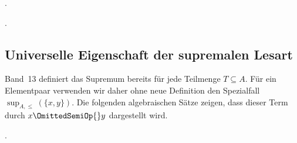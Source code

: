\documentclass[main.tex]{subfiles}
\begin{document}
\par\noindent\begin{minipage}{\linewidth}
\par\noindent{}.\par
\end{minipage}\par


\par\noindent\begin{minipage}{\linewidth}
\par\noindent{}.\par
\end{minipage}\par


\begin{tabproofwide}
\end{tabproofwide}

\subsection{Universelle Eigenschaft der supremalen Lesart}

Band~13 definiert das Supremum bereits für jede Teilmenge \(T\subseteq A\).
Für ein Elementpaar verwenden wir daher ohne neue Definition den Spezialfall
\(\sup_{A,\leq}(\{x,y\})\). Die folgenden algebraischen Sätze zeigen, dass
dieser Term durch \(x\OmittedSemiOp{}y\) dargestellt wird.

\par\noindent\begin{minipage}{\linewidth}
\par\noindent{}.\par
\end{minipage}\par
\end{document}
